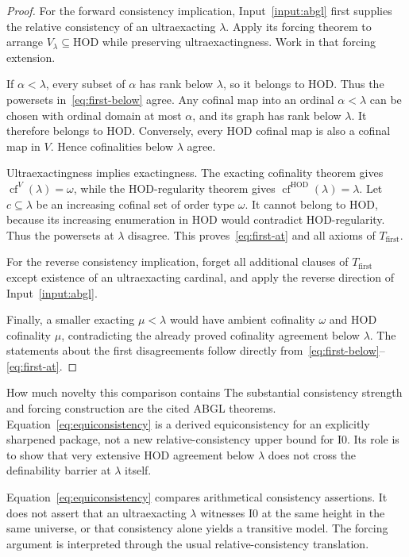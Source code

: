 \documentclass[11pt,letterpaper]{article}
\theoremstyle{definition}
\newcommand{\HOD}{\mathrm{HOD}}
\newcommand{\cf}{\operatorname{cf}}
\newcommand{\Izero}{\mathrm{I0}}
\theoremstyle{remark}
\begin{document}
\begin{proof}
For the forward consistency implication, Input~\ref{input:abgl} first supplies the relative consistency of an ultraexacting $\lambda$. Apply its forcing theorem to arrange $V_\lambda\subseteq\HOD$ while preserving ultraexactingness. Work in that forcing extension.

If $\alpha<\lambda$, every subset of $\alpha$ has rank below $\lambda$, so it belongs to HOD. Thus the powersets in~\eqref{eq:first-below} agree. Any cofinal map into an ordinal $\alpha<\lambda$ can be chosen with ordinal domain at most $\alpha$, and its graph has rank below $\lambda$. It therefore belongs to HOD. Conversely, every HOD cofinal map is also a cofinal map in $V$. Hence cofinalities below $\lambda$ agree.

Ultraexactingness implies exactingness. The exacting cofinality theorem gives $\cf^V(\lambda)=\omega$, while the HOD-regularity theorem gives $\cf^\HOD(\lambda)=\lambda$. Let $c\subseteq\lambda$ be an increasing cofinal set of order type $\omega$. It cannot belong to HOD, because its increasing enumeration in HOD would contradict HOD-regularity. Thus the powersets at $\lambda$ disagree. This proves~\eqref{eq:first-at} and all axioms of $T_{\mathrm{first}}$.

For the reverse consistency implication, forget all additional clauses of $T_{\mathrm{first}}$ except existence of an ultraexacting cardinal, and apply the reverse direction of Input~\ref{input:abgl}.

Finally, a smaller exacting $\mu<\lambda$ would have ambient cofinality $\omega$ and HOD cofinality $\mu$, contradicting the already proved cofinality agreement below $\lambda$. The statements about the first disagreements follow directly from~\eqref{eq:first-below}--\eqref{eq:first-at}.
\end{proof}

\begin{assessment}{How much novelty this comparison contains}
The substantial consistency strength and forcing construction are the cited ABGL theorems. Equation~\eqref{eq:equiconsistency} is a derived equiconsistency for an explicitly sharpened package, not a new relative-consistency upper bound for $\Izero$. Its role is to show that very extensive HOD agreement below $\lambda$ does not cross the definability barrier at $\lambda$ itself.
\end{assessment}

Equation~\eqref{eq:equiconsistency} compares arithmetical consistency assertions. It does not assert that an ultraexacting $\lambda$ witnesses $\Izero$ at the same height in the same universe, or that consistency alone yields a transitive model. The forcing argument is interpreted through the usual relative-consistency translation.
\end{document}
